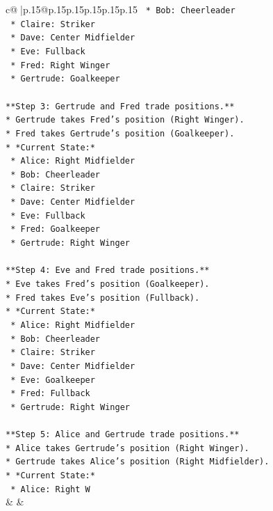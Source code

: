 \documentclass{article}
\begin{document}
{\begin{supertabular}{c@{$\;$}|p{.15\linewidth}@{}p{.15\linewidth}p{.15\linewidth}p{.15\linewidth}p{.15\linewidth}p{.15\linewidth}}
{{{\texttt{    *   Bob: Cheerleader} \\
\texttt{    *   Claire: Striker} \\
\texttt{    *   Dave: Center Midfielder} \\
\texttt{    *   Eve: Fullback} \\
\texttt{    *   Fred: Right Winger} \\
\texttt{    *   Gertrude: Goalkeeper} \\
\\ 
\texttt{**Step 3: Gertrude and Fred trade positions.**} \\
\texttt{*   Gertrude takes Fred's position (Right Winger).} \\
\texttt{*   Fred takes Gertrude's position (Goalkeeper).} \\
\texttt{*   *Current State:*} \\
\texttt{    *   Alice: Right Midfielder} \\
\texttt{    *   Bob: Cheerleader} \\
\texttt{    *   Claire: Striker} \\
\texttt{    *   Dave: Center Midfielder} \\
\texttt{    *   Eve: Fullback} \\
\texttt{    *   Fred: Goalkeeper} \\
\texttt{    *   Gertrude: Right Winger} \\
\\ 
\texttt{**Step 4: Eve and Fred trade positions.**} \\
\texttt{*   Eve takes Fred's position (Goalkeeper).} \\
\texttt{*   Fred takes Eve's position (Fullback).} \\
\texttt{*   *Current State:*} \\
\texttt{    *   Alice: Right Midfielder} \\
\texttt{    *   Bob: Cheerleader} \\
\texttt{    *   Claire: Striker} \\
\texttt{    *   Dave: Center Midfielder} \\
\texttt{    *   Eve: Goalkeeper} \\
\texttt{    *   Fred: Fullback} \\
\texttt{    *   Gertrude: Right Winger} \\
\\ 
\texttt{**Step 5: Alice and Gertrude trade positions.**} \\
\texttt{*   Alice takes Gertrude's position (Right Winger).} \\
\texttt{*   Gertrude takes Alice's position (Right Midfielder).} \\
\texttt{*   *Current State:*} \\
\texttt{    *   Alice: Right W} \\
            }
        }
    }
    & & \\ \\


\end{supertabular}}
\end{document}
